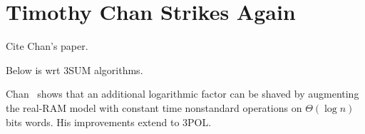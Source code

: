 \section{Timothy Chan Strikes Again}

Cite Chan's paper.

Below is wrt 3SUM algorithms.

Chan~\cite{Ch18} shows that an additional logarithmic factor can be shaved
by augmenting the real-RAM model with constant time nonstandard operations on
$\Theta(\log n)$ bits words. His improvements extend to 3POL.
